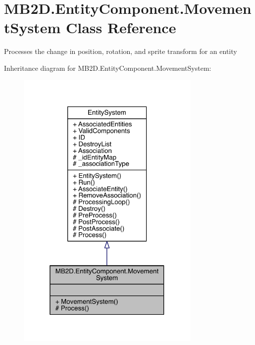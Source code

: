 \hypertarget{class_m_b2_d_1_1_entity_component_1_1_movement_system}{}\section{M\+B2\+D.\+Entity\+Component.\+Movement\+System Class Reference}
\label{class_m_b2_d_1_1_entity_component_1_1_movement_system}


Processes the change in position, rotation, and sprite transform for an entity  




Inheritance diagram for M\+B2\+D.\+Entity\+Component.\+Movement\+System\+:
\nopagebreak
\begin{figure}[H]
\begin{center}
\leavevmode
\includegraphics[width=253pt]{class_m_b2_d_1_1_entity_component_1_1_movement_system__inherit__graph}
\end{center}
\end{figure}


